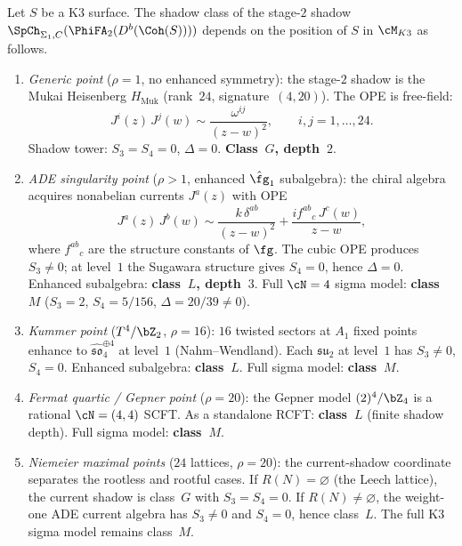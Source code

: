 \begin{proposition}
\label{prop:k3-shadow-class-landscape}
Let $S$ be a K3 surface. The shadow class of the stage-$2$ shadow
$\SpCh_{\Sigma_1, C}(\PhiFA_2(D^b(\Coh(S))))$ depends on the position of $S$ in $\cM_{K3}$
as follows.
\begin{enumerate}[label=(\roman*)]
\item \emph{Generic point} ($\rho = 1$, no enhanced symmetry):
 the stage-$2$ shadow is the Mukai Heisenberg $H_{\mathrm{Muk}}$
 (rank~$24$, signature~$(4,20)$). The OPE is free-field:
 \[
 J^i(z)\,J^j(w) \sim \frac{\omega^{ij}}{(z-w)^2},
 \qquad i,j = 1,\dotsc,24.
 \]
 Shadow tower: $S_3 = S_4 = 0$, $\Delta = 0$.
 \textbf{Class~$G$, depth~$2$}.

\item \emph{ADE singularity point} ($\rho > 1$, enhanced $\hat{\fg}_1$
 subalgebra): the chiral algebra acquires nonabelian currents
 $J^a(z)$ with OPE
 \[
 J^a(z)\,J^b(w) \sim \frac{k\,\delta^{ab}}{(z-w)^2}
 + \frac{if^{ab}{}_c\,J^c(w)}{z - w},
 \]
 where $f^{ab}{}_c$ are the structure constants of $\fg$.
 The cubic OPE produces $S_3 \neq 0$; at level~$1$ the Sugawara
 structure gives $S_4 = 0$, hence $\Delta = 0$.
 Enhanced subalgebra: \textbf{class~$L$, depth~$3$}.
 Full $\cN = 4$ sigma model: \textbf{class~$M$}
 ($S_3 = 2$, $S_4 = 5/156$, $\Delta = 20/39 \neq 0$).

\item \emph{Kummer point} ($T^4/\bZ_2$, $\rho = 16$):
 $16$ twisted sectors at $A_1$ fixed points enhance to
 $\hat{\mathfrak{so}}_4^{\oplus 4}$ at level~$1$ (Nahm--Wendland).
 Each $\hat{\mathfrak{su}}_2$ at level~$1$ has $S_3 \neq 0$,
 $S_4 = 0$. Enhanced subalgebra: \textbf{class~$L$}.
 Full sigma model: \textbf{class~$M$}.

\item \emph{Fermat quartic / Gepner point} ($\rho = 20$):
 the Gepner model $(2)^4/\bZ_4$ is a rational $\cN = (4,4)$ SCFT.
 As a standalone RCFT: \textbf{class~$L$} (finite shadow depth).
 Full sigma model: \textbf{class~$M$}.

\item \emph{Niemeier maximal points} ($24$ lattices, $\rho = 20$):
 the current-shadow coordinate separates the rootless and rootful cases.
 If $R(N)=\varnothing$ (the Leech lattice), the current shadow is
 class~$G$ with $S_3=S_4=0$. If $R(N)\neq\varnothing$, the weight-one
 ADE current algebra has $S_3\neq 0$ and $S_4=0$, hence class~$L$.
 The full K3 sigma model remains class~$M$.
\end{enumerate}
\end{proposition}

